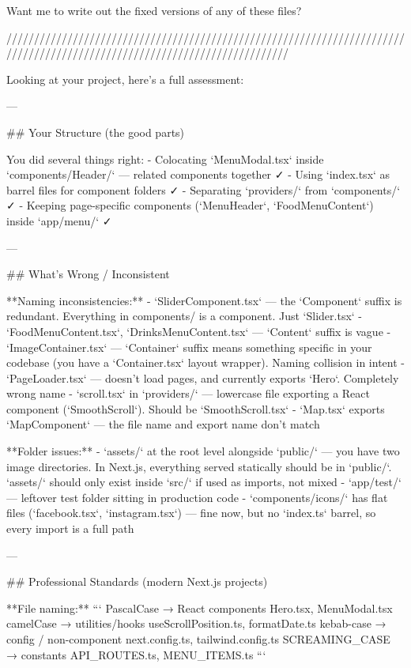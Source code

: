 Want me to write out the fixed versions of any of these files?


///////////////////////////////////////////////////////////////////////////////////////////////////////////////////////////




Looking at your project, here's a full assessment:

---

## Your Structure (the good parts)

You did several things right:
- Colocating `MenuModal.tsx` inside `components/Header/` — related components together ✓
- Using `index.tsx` as barrel files for component folders ✓
- Separating `providers/` from `components/` ✓
- Keeping page-specific components (`MenuHeader`, `FoodMenuContent`) inside `app/menu/` ✓

---

## What's Wrong / Inconsistent

**Naming inconsistencies:**
- `SliderComponent.tsx` — the `Component` suffix is redundant. Everything in components/ is a component. Just `Slider.tsx`
- `FoodMenuContent.tsx`, `DrinksMenuContent.tsx` — `Content` suffix is vague
- `ImageContainer.tsx` — `Container` suffix means something specific in your codebase (you have a `Container.tsx` layout wrapper). Naming collision in intent
- `PageLoader.tsx` — doesn't load pages, and currently exports `Hero`. Completely wrong name
- `scroll.tsx` in `providers/` — lowercase file exporting a React component (`SmoothScroll`). Should be `SmoothScroll.tsx`
- `Map.tsx` exports `MapComponent` — the file name and export name don't match

**Folder issues:**
- `assets/` at the root level alongside `public/` — you have two image directories. In Next.js, everything served statically should be in `public/`. `assets/` should only exist inside `src/` if used as imports, not mixed
- `app/test/` — leftover test folder sitting in production code
- `components/icons/` has flat files (`facebook.tsx`, `instagram.tsx`) — fine now, but no `index.ts` barrel, so every import is a full path

---

## Professional Standards (modern Next.js projects)

**File naming:**
```
PascalCase     → React components       Hero.tsx, MenuModal.tsx
camelCase      → utilities/hooks        useScrollPosition.ts, formatDate.ts
kebab-case     → config / non-component next.config.ts, tailwind.config.ts
SCREAMING_CASE → constants              API_ROUTES.ts, MENU_ITEMS.ts
```

